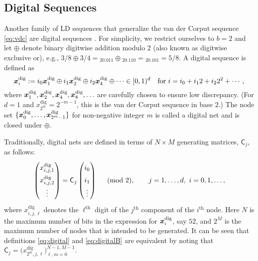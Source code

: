\documentclass{svproc}
\begin{document}

\subsection{Digital Sequences} \label{sec:digital}

Another family of LD sequences that generalize the van der Corput sequence \eqref{eq:vdc} are digital sequences \cite{DicPil10a,Nie92}.  For simplicity, we restrict ourselves to $b = 2$ and let $\oplus$ denote binary digitwise addition modulo $2$ (also known as digitwise exclusive or), e.g., $3/8 \oplus 3/4 = {}_20.011 \oplus {}_20.110 = {}_20.101 = 5/8$.  A digital sequence is defined as
\begin{equation} \label{eq:digital}
	{\boldsymbol{x}}_i^{\text{dig}} := i_0 {\boldsymbol{x}}^{\text{dig}} _1 \oplus i_1 {\boldsymbol{x}}^{\text{dig}}_2 \oplus i_2 {\boldsymbol{x}}^{\text{dig}} _4 \oplus \cdots \in [0,1)^d \quad \text{for }
	i = i_0 + i_12 + i_2 2^2 + \cdots,
\end{equation}
where ${\boldsymbol{x}}^{\text{dig}}_1, {\boldsymbol{x}}^{\text{dig}}_2, {\boldsymbol{x}}^{\text{dig}}_4, {\boldsymbol{x}}^{\text{dig}}_8, \ldots$ are carefully chosen to ensure low discrepancy.  (For $d=1$ and $x^{\text{dig}}_{2^m} = 2^{-m-1}$, this is the van  der Corput sequence in base $2$.) The node set $\{ {\boldsymbol{x}}^{\text{dig}}_0, \ldots, {\boldsymbol{x}}^{\text{dig}}_{2^m-1}\}$  for non-negative integer $m$ is called a digital net and is closed under $\oplus$.

Traditionally, digital nets are defined in terms of $N \times M$ generating matrices, $\mathsf{C}_j$, as follows:
\begin{equation} \label{eq:digitalB}
\renewcommand{\arraystretch}{1.5}
	\begin{pmatrix} x^{\text{dig}}_{i,j,1} \\ x^{\text{dig}}_{i,j,2} \\ \vdots \end{pmatrix}
	= \mathsf{C}_j \begin{pmatrix} i_0 \\ i_1 \\ \vdots \end{pmatrix}
    \quad \pmod{2}, \qquad j = 1,\ldots, d, \ i = 0, 1, \ldots,
\end{equation}
where $x^{\text{dig}}_{i,j,\ell}$ denotes the $\ell^{\text{th}}$ digit of the $j^{\text{th}}$ component of the $i^{\text{th}}$ node.  Here $N$ is the maximum number of bits in the expression for ${\boldsymbol{x}}^{\text{dig}}_i$, say $52$, and $2^M$ is the maximum number of nodes that is intended to be generated.
It can be seen that definitions  \eqref{eq:digital} and \eqref{eq:digitalB} are equivalent by noting that $\mathsf{C}_j = \bigl(x^{\text{dig}}_{2^m,j,\ell}\bigr)_{\ell,m = 0}^{N-1,M-1}$.
\end{document}
